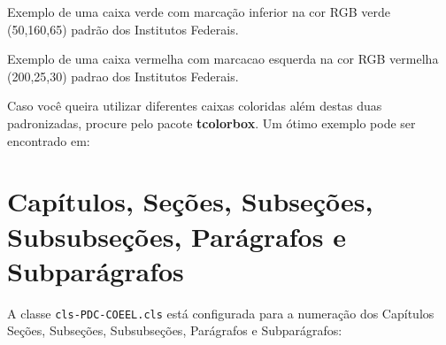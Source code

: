 \begin{Codigo}[language=tex, 
    caption=Sintaxe para adicionar Caixas Coloridas no Texto, 
    label=cod:Caixas]
    \begin{CaixaVerde}
        Exemplo de uma caixa verde com marcação inferior 
        na cor RGB verde (50,160,65) padrão dos Institutos 
        Federais.
    \end{CaixaVerde}
    
    \begin{CaixaVermelha}
        Exemplo de uma caixa vermelha com marcacao esquerda 
        na cor RGB vermelha (200,25,30) padrao dos Institutos 
        Federais.
    \end{CaixaVermelha}
\end{Codigo}



\vspace{1cm}
Caso você queira utilizar diferentes caixas coloridas além destas duas padronizadas, procure pelo pacote {\bf tcolorbox}. Um ótimo exemplo pode ser encontrado em:


\clearpage\newpage\pagebreak

\section{Capítulos, Seções, Subseções, Subsubseções, Parágrafos e Subparágrafos}

A classe \verb|cls-PDC-COEEL.cls| está configurada para a numeração dos
Capítulos Seções, Subseções, Subsubseções, Parágrafos e Subparágrafos:

